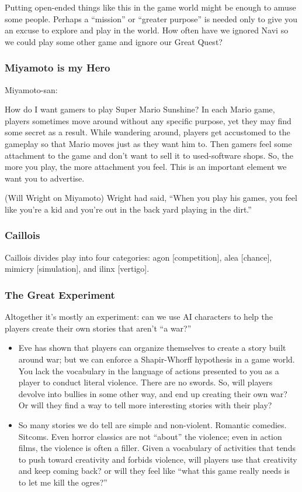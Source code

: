 \documentclass[11pt]{article}
\begin{document}
Putting open-ended things like this in  the game world might be enough
to  amuse some  people. Perhaps  a “mission”  or “greater  purpose” is
needed  only  to  give you  an  excuse  to  explore  and play  in  the
world. How often have we ignored Navi so we could play some other game
and ignore our Great Quest?
\subsubsection{Miyamoto is my Hero}
\label{sec-1-1-6}

Miyamoto-san:

How do I want gamers to play Super Mario Sunshine? In each Mario game,
players sometimes move  around without any specific  purpose, yet they
may find some secret as a  result. While wandering around, players get
accustomed to the  gameplay so that Mario moves just  as they want him
to. Then  gamers feel some  attachment to the  game and don't  want to
sell  it to  used-software  shops. So,  the more  you  play, the  more
attachment  you  feel.  This  is  an important  element  we  want  you
to advertise.

(Will Wright on  Miyamoto) Wright had said, “When you  play his games,
you feel like you’re a kid and  you’re out in the back yard playing in
the dirt.”
\subsubsection{Caillois}
\label{sec-1-1-7}

Caillois divides  play into four categories:  agon [competition], alea
[chance], mimicry [simulation], and ilinx [vertigo].
\subsubsection{The Great Experiment}
\label{sec-1-1-8}

Altogether it's mostly an experiment: can we use AI characters to help
the players create their own stories that aren't “a war?”

\begin{itemize}
\item Eve  has shown  that players  can organize  themselves to  create a
story  built  around  war;  but  we  can  enforce  a  Shapir-Whorff
hypothesis in a game world. You lack the vocabulary in the language
of  actions  presented  to  you  as a  player  to  conduct  literal
violence.  There  are no  swords.  So,  will players  devolve  into
bullies in  some other way, and  end up creating their  own war? Or
will  they  find  a  way  to tell  more  interesting  stories  with
their play?

\item So  many stories we  do tell  are simple and  non-violent. Romantic
comedies.  Sitcoms.  Even  horror  classics  are  not  “about”  the
violence;  even   in  action  films,   the  violence  is   often  a
filler. Given a vocabulary of  activities that tends to push toward
creativity and  forbids violence, will players  use that creativity
and keep coming back? or will they feel like “what this game really
needs is to let me kill the ogres?”
\end{itemize}
\end{document}

